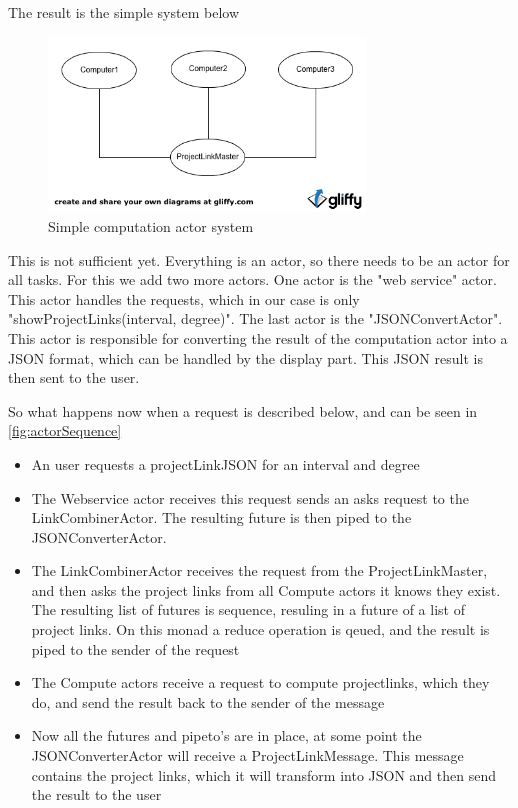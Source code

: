 \documentclass[10pt,a4paper]{article}
\begin{document}
The result is the simple system below

\begin{figure}[htb]
    \centering
    \includegraphics[width=0.75\textwidth]{actors_simple}
    \caption{Simple computation actor system}
    \label{fig:simple computation actor system}
\end{figure}


This is not sufficient yet. Everything is an actor, so there needs to be an actor for all tasks. For this we add two more actors. One actor is the "web service" actor. This actor handles the requests, which in our case is only "showProjectLinks(interval, degree)". The last actor is the "JSONConvertActor". This actor is responsible for converting the result of the computation actor into a JSON format, which can be handled by the display part. This JSON result is then sent to the user.

So what happens now when a request is described below, and can be seen in \ref{fig:actorSequence}

\begin{itemize}
	\item{An user requests a projectLinkJSON for an interval and degree}
	\item{The Webservice actor receives this request sends an asks request to the LinkCombinerActor. The resulting future is then piped to the JSONConverterActor.}
	\item{The LinkCombinerActor receives the request from the ProjectLinkMaster, and then asks the project links from all Compute actors it knows they exist. The resulting list of futures is sequence, resuling in a future of a list of project links. On this monad a reduce operation is qeued, and the result is piped to the sender of the request}
	\item{The Compute actors receive a request to compute projectlinks, which they do, and send the result back to the sender of the message}
	\item{Now all the futures and pipeto's are in place, at some point the JSONConverterActor will receive a ProjectLinkMessage. This message contains the project links, which it will transform into JSON and then send the result to the user}
\end{itemize}
\end{document}
